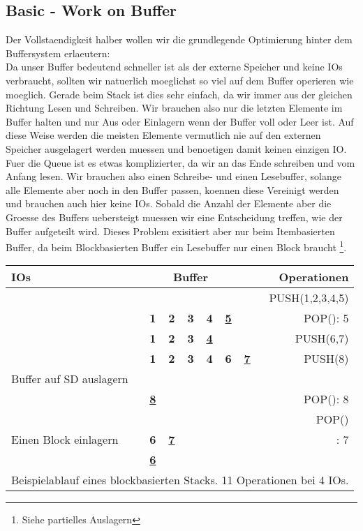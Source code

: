 \documentclass[10pt,a4paper]{article}
\begin{document}
\subsection{Basic - Work on Buffer}
Der Vollstaendigkeit halber wollen wir die grundlegende Optimierung hinter dem Buffersystem erlaeutern:\\
Da unser Buffer bedeutend schneller ist als der externe Speicher und keine IOs verbraucht, sollten wir natuerlich moeglichst so viel auf dem Buffer operieren wie moeglich. Gerade beim Stack ist dies sehr einfach, da wir immer aus der gleichen Richtung Lesen und Schreiben. Wir brauchen also nur die letzten Elemente im Buffer halten und nur Aus oder Einlagern wenn der Buffer voll oder Leer ist. Auf diese Weise werden die meisten Elemente vermutlich nie auf den externen Speicher ausgelagert werden muessen und benoetigen damit keinen einzigen IO. Fuer die Queue ist es etwas komplizierter, da wir an das Ende schreiben und vom Anfang lesen. Wir brauchen also einen Schreibe- und einen Lesebuffer, solange alle Elemente aber noch in den Buffer passen, koennen diese Vereinigt werden und brauchen auch hier keine IOs. Sobald die Anzahl der Elemente aber die Groesse des Buffers uebersteigt muessen wir eine Entscheidung treffen, wie der Buffer aufgeteilt wird. Dieses Problem exisitiert aber nur beim Itembasierten Buffer, da beim Blockbasierten Buffer ein Lesebuffer nur einen Block braucht \footnote{Siehe partielles Auslagern}.\\
	\begin{tabular}{l || c | c || c | c || c | c || r }
	IOs & \multicolumn{5}{c}{Buffer} && Operationen \\
	\hline
	\hline
	 & & & & & & &   PUSH(1,2,3,4,5)\\
	\hline
	 & \bf{1} & \bf{2} & \bf{3} & \bf{4} & \underline{\bf{5}} & & POP(): 5\\
	\hline
	 & \bf{1} & \bf{2} & \bf{3} & \underline{\bf{4}} & & & PUSH(6,7)\\
	\hline
	 & \bf{1} & \bf{2} & \bf{3} & \bf{4} & \bf{6} & \underline{\bf{7}} & PUSH(8)\\
	\hline
	Buffer auf SD auslagern & & & & &  & & \\
	\hline
	 & \underline{\bf{8}} & & & & &  & POP(): 8 \\
	\hline
	 & & & & & & &  POP()\\
	\hline
	Einen Block einlagern & \bf{6} & \underline{\bf{7}} & & & & &: 7\\
	\hline
	 & \underline{\bf{6}} & & & & & & \\
	 \hline
	 \hline
	\multicolumn{8}{c}{Beispielablauf eines blockbasierten Stacks. 11 Operationen bei 4 IOs.}
	\end{tabular}
\end{document}
